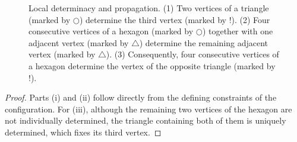 \documentclass[11pt]{article}
\theoremstyle{plain}
\theoremstyle{definition}
\begin{document}
\begin{figure}[ht]
\centering

\setlength{\arraycolsep}{6pt}
\renewcommand{\arraystretch}{1.2}
\setlength{\fboxsep}{4pt}
\setlength{\fboxrule}{0.5pt}


\caption{
Local determinacy and propagation.
(1) Two vertices of a triangle (marked by $\bigcirc$) determine the third vertex (marked by $!$).
(2) Four consecutive vertices of a hexagon (marked by $\bigcirc$) together with one adjacent vertex (marked by $\triangle$) determine the remaining adjacent vertex (marked by $\triangle$).
(3) Consequently, four consecutive vertices of a hexagon determine the vertex of the opposite triangle (marked by $!$).
}

\label{fig:hexagon_propagation}
\end{figure}


\begin{proof}
Parts (i) and (ii) follow directly from the defining constraints of the configuration. 
For (iii), although the remaining two vertices of the hexagon are not individually determined, the triangle containing both of them is uniquely determined, which fixes its third vertex.
\end{proof}
\end{document}
